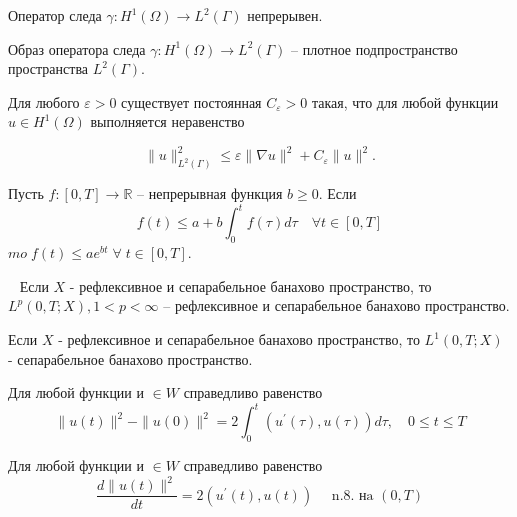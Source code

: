 \begin{lemma}
    \label{lm:1_7:19}\cite[239]{Zeidler1990a}
    Оператор следа $\gamma: H^{1}(\Omega) \rightarrow L^{2}(\Gamma)$ непрерывен.
\end{lemma}

\begin{lemma}
    \label{lm:1_7:20}\cite[4]{girault1979finite}
    Образ оператора следа $\gamma: H^{1}(\Omega) \rightarrow L^{2}(\Gamma)$
    -- плотное подпространство пространства $L^{2}(\Gamma)$.
\end{lemma}

\begin{lemma}
    \label{lm:1_7:23}\cite[41]{grisvard1985elliptic}
    Для любого $\varepsilon>0$ существует постоянная $C_{\varepsilon}>0$ такая,
    что для любой функции $u \in H^{1}(\Omega)$ выполняется неравенство

    \[
        \|u\|_{L^{2}(\Gamma)}^{2} \leq \varepsilon\|\nabla u\|^{2}
        +C_{\varepsilon}\|u\|^{2}.
    \]
\end{lemma}

\begin{lemma}[Гронуолл]
    \label{lm:1_7:24}\cite[191]{Gaevskii1978}
    Пусть $f:[0, T] \rightarrow \mathbb{R}$ -- непрерывная функция $b \geq 0$.
    Если
    \[
        f(t) \leq a+b \int_{0}^{t} f(\tau) d \tau \quad \forall t \in[0, T]
    \]
    $mo \; f(t) \leq a e^{bt} \; \forall \; t \in[0, T]$.
\end{lemma}

\begin{lemma}
    \label{lm:1_7:28}~\cite[411]{Zeidler1990a}
    Если $X$ - рефлексивное и сепарабельное банахово пространство,
    то $L^{p}(0, T ; X), 1<p<\infty$ -- рефлексивное
    и сепарабельное банахово пространство.
\end{lemma}

\begin{lemma}
    \label{lm:1_7:29}\cite[449]{Zeidler1990a}
    Если $X$ - рефлексивное и сепарабельное банахово пространство,
    то $L^{1}(0, T ; X)$ - сепарабельное банахово пространство.
\end{lemma}

\begin{lemma}
    \label{lm:1_7:31}\cite[423]{Zeidler1990a}
    Для любой функции и $\in W$ справедливо равенство
    \[
        \|u(t)\|^{2}-\|u(0)\|^{2}=2 \int_{0}^{t}\left(u^{\prime}(\tau),
        u(\tau)\right) d \tau, \quad 0 \leq t \leq T
    \]
\end{lemma}

\begin{lemma}
    \label{lm:1_7:32}\cite[356]{Kolmogorov2004}
    Для любой функции и $\in W$ справедливо равенство
    \[
        \frac{d\|u(t)\|^{2}}{d t}=2\left(u^{\prime}(t),
        u(t)\right) \quad \text { n.8. нa }(0, T)
    \]
\end{lemma}
